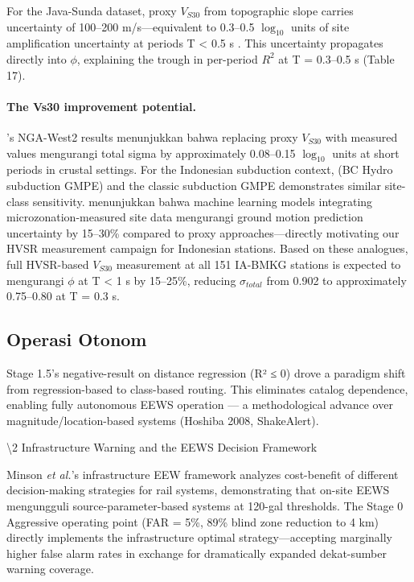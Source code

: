 \documentclass[10pt]{article}
\renewcommand{\cite}[1]{\citep{#1}}
\newcommand{\etal}{\textit{et al.}}
\begin{document}
For the Java-Sunda dataset, proxy \(V_{S30}\) from topographic slope carries uncertainty of 100--200 m/s---equivalent to 0.3--0.5 \(\log_{10}\) units of site amplification uncertainty at periods T \textless{} 0.5 s \cite{ref45}. This uncertainty propagates directly into \(\phi\), explaining the trough in per-period \(R^2\) at T = 0.3--0.5 s (Table 17).

\paragraph{The Vs30 improvement potential.} \citet{ref48}'s NGA-West2 results menunjukkan bahwa replacing proxy \(V_{S30}\) with measured values mengurangi total sigma by approximately 0.08--0.15 \(\log_{10}\) units at short periods in crustal settings. For the Indonesian subduction context, \citet{ref61} (BC Hydro subduction GMPE) and the classic \citet{ref63} subduction GMPE demonstrates similar site-class sensitivity. \citet{ref87} menunjukkan bahwa machine learning models integrating microzonation-measured site data mengurangi ground motion prediction uncertainty by 15--30\% compared to proxy approaches---directly motivating our HVSR measurement campaign for Indonesian stations. Based on these analogues, full HVSR-based \(V_{S30}\) measurement at all 151 IA-BMKG stations is expected to mengurangi \(\phi\) at T \textless{} 1 s by 15--25\%, reducing \(\sigma_{total}\) from 0.902 to approximately 0.75--0.80 at T = 0.3 s.

\subsection{Operasi Otonom}

Stage 1.5's negative-result on distance regression (R² ≤ 0) drove a paradigm shift from regression-based to class-based routing. This eliminates catalog dependence, enabling fully autonomous EEWS operation --- a methodological advance over magnitude/location-based systems (Hoshiba 2008, ShakeAlert).

\textbackslash2 Infrastructure Warning and the EEWS Decision Framework

Minson \etal{}'s infrastructure EEW framework \cite{ref11} analyzes cost-benefit of different decision-making strategies for rail systems, demonstrating that on-site EEWS mengungguli source-parameter-based systems at 120-gal thresholds. The Stage 0 Aggressive operating point (FAR = 5\%, 89\% blind zone reduction to 4 km) directly implements the infrastructure optimal strategy---accepting marginally higher false alarm rates in exchange for dramatically expanded dekat-sumber warning coverage.
\end{document}
